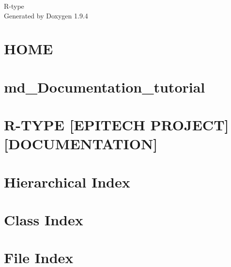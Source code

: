\documentclass[twoside]{book}
\newcommand{\+}{\discretionary{\mbox{\scriptsize$\hookleftarrow$}}{}{}}
\newcommand{\clearemptydoublepage}{%
    \newpage{\pagestyle{empty}\cleardoublepage}%
  }
\begin{document}
  \raggedbottom
    \hypersetup{pageanchor=false,
                bookmarksnumbered=true,
                pdfencoding=unicode
               }
  \begin{titlepage}
  \vspace*{7cm}
  \begin{center}%
  {\Large R-\/type}\\
  \vspace*{1cm}
  {\large Generated by Doxygen 1.9.4}\\
  \end{center}
  \end{titlepage}
  \clearemptydoublepage
  \tableofcontents
  \clearemptydoublepage
  \hypersetup{pageanchor=true}
\chapter{HOME}
\label{index}\hypertarget{index}{}
\chapter{md\+\_\+\+Documentation\+\_\+tutorial}
\label{md__documentation_tutorial}

\chapter{R-\/\+TYPE \mbox{[}EPITECH PROJECT\mbox{]} \mbox{[}DOCUMENTATION\mbox{]}}
\label{md__r_e_a_d_m_e}

\chapter{Hierarchical Index}

\chapter{Class Index}

\chapter{File Index}

\end{document}
